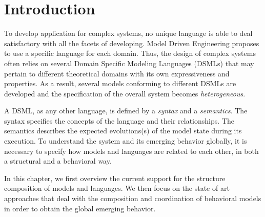 \section{Introduction}
To develop application for complex systems, no unique language is able to deal satisfactory with all the facets of developing. Model Driven Engineering proposes to use a specific language for each domain. Thus, the design of complex systems often relies on several Domain Specific Modeling Languages (DSMLs) that may pertain to different theoretical domains with its own expressiveness and properties. As a result, several models conforming to different DSMLs are developed and the specification of the overall system becomes \emph{heterogeneous}. 
	
A DSML, as any other language, is defined by a \emph{syntax} and a \emph{semantics}. The syntax specifies the concepts of the language and their relationships. The semantics describes the expected evolutions(s) of the model state during its execution. To understand the system and its emerging behavior globally, it is necessary to specify how models and languages are related to each other, in both a structural and a behavioral way. 
	
In this chapter, we first overview the current support for the structure composition of models and languages. We then focus on the state of art approaches that deal with the composition and coordination of behavioral models in order to obtain the global emerging behavior.  